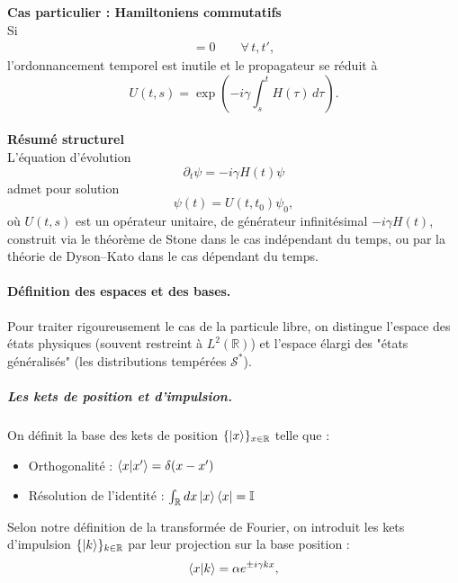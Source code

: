 {\bf Cas particulier : Hamiltoniens commutatifs}\\

Si
\begin{eqnarray}
    [H(t),H(t')]=0
\qquad \forall\,t,t',
\end{eqnarray}
l’ordonnancement temporel est inutile et le propagateur se réduit à
\begin{equation}
    \label{eq:commuting-hamiltonians}
    U(t,s)=
    \exp\!\left(
    -i\gamma \int_s^t H(\tau)\,d\tau
    \right).
\end{equation}\\

{\bf Résumé structurel}\\

L’équation d’évolution
\begin{equation}
    \partial_t\psi = -i\gamma H(t)\psi
\end{equation}
admet pour solution
\begin{equation}
    \psi(t)=U(t,t_0)\psi_0,
\end{equation}
où $U(t,s)$ est un opérateur unitaire, de générateur infinitésimal
$-i\gamma H(t)$, construit via le théorème de Stone dans le cas indépendant
du temps, ou par la théorie de Dyson–Kato dans le cas dépendant du temps.





\paragraph{Définition des espaces et des bases.}

Pour traiter rigoureusement le cas de la particule libre, on distingue l'espace des états physiques (souvent restreint à $L^2(\mathbb{R})$) et l'espace élargi des "états généralisés" (les distributions tempérées $\mathcal{S}^*$).

\subparagraph{Les kets de position et d'impulsion.}
On définit la base des kets de position $\{ \ket{x} \}_{x \in \mathbb{R}}$ telle que :
\begin{itemize}[label = $\bullet$]
    \item Orthogonalité : $\braket{x | x'} = \delta(x - x')$
    \item Résolution de l'identité : $\int_{\mathbb{R}} dx \ket{x}\bra{x} = \mathbb{I}$
\end{itemize}
Selon notre définition de la transformée de Fourier, on introduit les kets d'impulsion $\{ \ket{k} \}_{k \in \mathbb{R}}$ par leur projection sur la base position :
\begin{eqnarray}
    \braket{x | k} = \alpha e^{\pm i \gamma k x},
\end{eqnarray}

